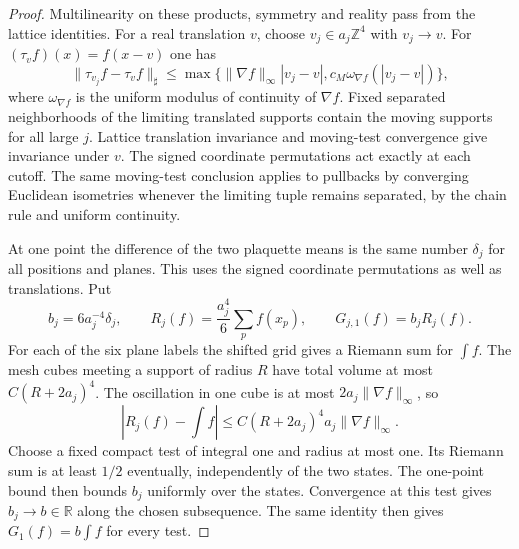 \documentclass[11pt,letterpaper,reqno]{amsart}
\numberwithin{equation}{section}
\theoremstyle{definition}
\theoremstyle{remark}
\begin{document}
\begin{proof}
Multilinearity on these products, symmetry and reality pass from
the lattice identities. For a real translation \(v\), choose
\(v_j\in a_j\mathbb Z^4\) with \(v_j\to v\). For
\((\tau_v f)(x)=f(x-v)\) one has
\[
 \|\tau_{v_j}f-\tau_v f\|_\sharp
 \le\max\{\|\nabla f\|_\infty |v_j-v|,
                  c_M\omega_{\nabla f}(|v_j-v|)\},
\]
where \(\omega_{\nabla f}\) is the uniform modulus of continuity
of \(\nabla f\). Fixed separated neighborhoods of the limiting
translated supports contain the moving supports for all large
\(j\). Lattice translation invariance and moving-test convergence
give invariance under \(v\). The signed coordinate permutations
act exactly at each cutoff. The same moving-test conclusion
applies to pullbacks by converging Euclidean isometries whenever
the limiting tuple remains separated, by the chain rule and
uniform continuity.

At one point the difference of the two plaquette means is the
same number \(\delta_j\) for all positions and planes. This uses
the signed coordinate permutations as well as translations.
Put
\begin{equation}\label{cl:eq-reference-mean}
 b_j=6a_j^{-4}\delta_j,\qquad
 R_j(f)=\frac{a_j^4}{6}\sum_p f(x_p),\qquad
 G_{j,1}(f)=b_jR_j(f).
\end{equation}
For each of the six plane labels the shifted grid gives a Riemann
sum for \(\int f\). The mesh cubes meeting a support of radius
\(R\) have total volume at most \(C(R+2a_j)^4\).
The oscillation in one cube is at most
\(2a_j\|\nabla f\|_\infty\), so
\[
 |R_j(f)-\textstyle\int f|
 \le C(R+2a_j)^4a_j\|\nabla f\|_\infty.
\]
Choose a fixed compact test of integral one and radius at most
one. Its Riemann sum is at least \(1/2\) eventually, independently
of the two states. The one-point bound then bounds \(b_j\)
uniformly over the states. Convergence at this test gives
\(b_j\to b\in\mathbb R\) along the chosen subsequence.
The same identity then gives \(G_1(f)=b\int f\) for every test.


\end{proof}
\end{document}
